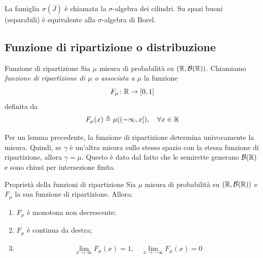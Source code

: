 \documentclass[a4paper]{article}
\begin{document}
La famiglia \(\sigma(\overline J)\)
è chiamata la \(\sigma\)-algebra dei cilindri. Su spazi buoni (separabili)
è equivalente alla \(\sigma\)-algebra di Borel.

\subsection{Funzione di ripartizione o distribuzione}

\begin{snippetdefinition}{Funzione di ripartizione}
    Sia \(\mu\) misura di probabilità su \((\mathbb{R}, \mathcal B(\mathbb{R}))\).
    Chiamiamo \emph{funzione di ripartizione di \(\mu\) o associata a \(\mu\)}
    la funzione \[
        F_\mu \colon \mathbb{R} \to [0,1]
    \]
    definita da
    \[
        F_\mu(x) \triangleq \mu((-\infty, x]), \quad \forall x \in \mathbb{R}
    \]
\end{snippetdefinition}

Per un lemma precedente, %
la funzione di ripartizione determina univocamente la misura.
Quindi, se \(\gamma\) è un'altra misura sullo stesso spazio con la stessa funzione di ripartizione,
allora \(\gamma = \mu\).
Questo è dato dal fatto che le semirette generano \(\mathcal B(\mathbb{R})\)
e sono chiusi per intersezione finita.

\begin{snippetproposition}{Proprietà della funzioni di ripartizione}
    Sia \(\mu\) misura di probabilità su \((\mathbb{R}, \mathcal B(\mathbb{R}))\)
    e \(F_\mu\) la sua funzione di ripartizione. Allora:
    \begin{enumerate}
        \item \(F_\mu\) è monotona non decrescente;
        \item \(F_\mu\) è continua da destra;
        \item \[
                \lim_{x\to \infty}F_\mu(x) = 1,\quad
                \lim_{x\to -\infty}F_\mu(x) = 0
            \]
    \end{enumerate}
\end{snippetproposition}
\end{document}
